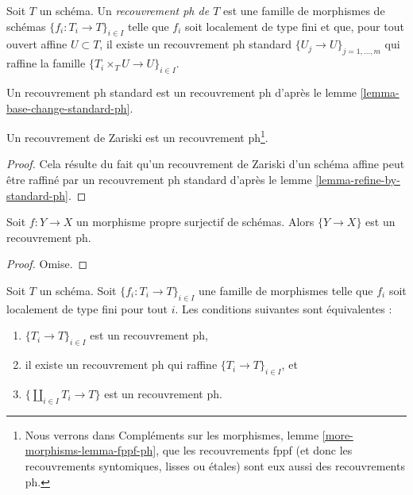 \begin{definition}
\label{definition-ph-covering}
Soit $T$ un schéma. Un {\it recouvrement ph de $T$} est une famille
de morphismes de schémas $\{f_i : T_i \to T\}_{i \in I}$ telle
que $f_i$ soit localement de type fini et que, pour tout
ouvert affine $U \subset T$, il existe un recouvrement ph standard
$\{U_j \to U\}_{j = 1, \ldots, m}$ qui raffine la famille
$\{T_i \times_T U \to U\}_{i \in I}$.
\end{definition}

\noindent
Un recouvrement ph standard est un recouvrement ph d'après le
lemme \ref{lemma-base-change-standard-ph}.

\begin{lemma}
\label{lemma-zariski-ph}
Un recouvrement de Zariski est un recouvrement ph\footnote{Nous verrons
dans Compléments sur les morphismes, lemme \ref{more-morphisms-lemma-fppf-ph}, que les
recouvrements fppf (et donc les recouvrements syntomiques, lisses ou \'etales)
sont eux aussi des recouvrements ph.}.
\end{lemma}

\begin{proof}
Cela résulte du fait qu'un recouvrement de Zariski d'un schéma affine
peut être raffiné par un recouvrement ph standard d'après le
lemme \ref{lemma-refine-by-standard-ph}.
\end{proof}

\begin{lemma}
\label{lemma-surjective-proper-ph}
Soit $f : Y \to X$ un morphisme propre surjectif de schémas.
Alors $\{Y \to X\}$ est un recouvrement ph.
\end{lemma}

\begin{proof}
Omise.
\end{proof}

\begin{lemma}
\label{lemma-refine-by-ph}
Soit $T$ un schéma. Soit $\{f_i : T_i \to T\}_{i \in I}$ une famille
de morphismes telle que $f_i$ soit localement de type fini pour tout $i$.
Les conditions suivantes sont équivalentes :
\begin{enumerate}
\item $\{T_i \to T\}_{i \in I}$ est un recouvrement ph,
\item il existe un recouvrement ph qui raffine $\{T_i \to T\}_{i \in I}$, et
\item $\{\coprod_{i \in I} T_i \to T\}$ est un recouvrement ph.
\end{enumerate}
\end{lemma}

